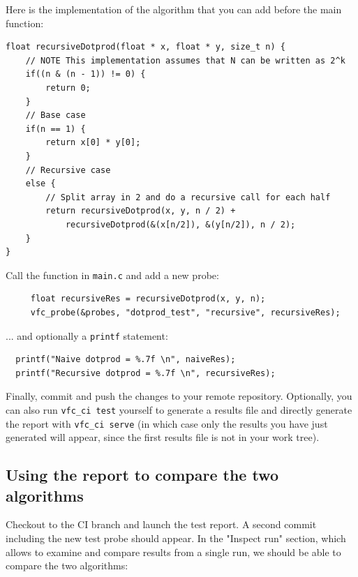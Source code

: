 \bigbreak

Here is the implementation of the algorithm that you can add before the main function:

\newpage

\begin{verbatim}
float recursiveDotprod(float * x, float * y, size_t n) {
	// NOTE This implementation assumes that N can be written as 2^k
	if((n & (n - 1)) != 0) {
		return 0;
	}
	// Base case
	if(n == 1) {
		return x[0] * y[0];
	}
	// Recursive case
	else {
		// Split array in 2 and do a recursive call for each half
		return recursiveDotprod(x, y, n / 2) +
			recursiveDotprod(&(x[n/2]), &(y[n/2]), n / 2);
	}
}
\end{verbatim}

Call the function in \texttt{main.c} and add a new probe:

\bigbreak

\begin{verbatim}
     float recursiveRes = recursiveDotprod(x, y, n);
     vfc_probe(&probes, "dotprod_test", "recursive", recursiveRes);
\end{verbatim}

... and optionally a \texttt{printf} statement:

\bigbreak

\begin{verbatim}
  printf("Naive dotprod = %.7f \n", naiveRes);
  printf("Recursive dotprod = %.7f \n", recursiveRes);
\end{verbatim}

Finally, commit and push the changes to your remote repository. Optionally, you
can also run \texttt{vfc_ci test} yourself to generate a results file
and directly generate the report with \texttt{vfc_ci serve} (in which case
only the results you have just generated will appear, since the first results
file is not in your work tree).


\subsection{Using the report to compare the two algorithms}

Checkout to the CI branch and launch the test report. A
second commit including the new test probe should appear. In the "Inspect run"
section, which allows to examine and compare results from a single run, we
should be able to compare the two algorithms:

